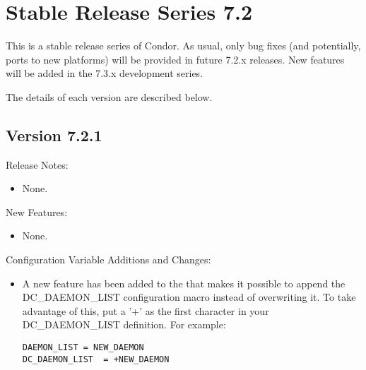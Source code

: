 
\section{\label{sec:History-7-2}Stable Release Series 7.2}

This is a stable release series of Condor.
As usual, only bug fixes (and potentially, ports to new platforms)
will be provided in future 7.2.x releases.
New features will be added in the 7.3.x development series.

The details of each version are described below.


\subsection*{\label{sec:New-7-2-1}Version 7.2.1}

\noindent Release Notes:

\begin{itemize}

\item None.

\end{itemize}


\noindent New Features:

\begin{itemize}

\item None.

\end{itemize}

\noindent Configuration Variable Additions and Changes:

\begin{itemize}

\item A new feature has been added to the  that makes
  it possible to append the DC\_DAEMON\_LIST configuration macro
  instead of overwriting it.  To take advantage of this, put a '+' as
  the first character in your DC\_DAEMON\_LIST definition.  For example:
\begin{verbatim}
DAEMON_LIST	= NEW_DAEMON
DC_DAEMON_LIST	= +NEW_DAEMON
\end{verbatim}

\end{itemize}

